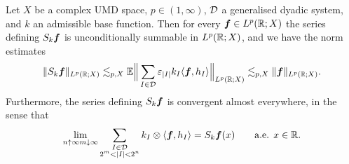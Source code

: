 \begin{thm}
  Let $X$ be a complex UMD space, $p \in (1,\infty)$, $\mathcal{D}$ a generalised dyadic system, and $k$ an admissible base function.
  Then for every $\bm{f} \in L^p(\mathbb{R};X)$ the series defining $S_{k}\bm{f}$ is unconditionally summable in $L^p(\mathbb{R};X)$,
  and we have the norm estimates
  \begin{equation*}
    \|S_{k} \bm{f}\|_{L^p(\mathbb{R};X)} \lesssim_{p,X} \mathbb{E} \Big\| \sum_{I \in \mathcal{D}} \varepsilon_{|I|} k_{I} \langle \bm{f}, h_{I} \rangle \Big\|_{L^p(\mathbb{R};X)} \lesssim_{p,X} \|\bm{f}\|_{L^p(\mathbb{R};X)}.
  \end{equation*}
  Furthermore, the series defining $S_{k}\bm{f}$ is convergent almost everywhere, in the sense that
  \begin{equation*}
    \lim_{\substack{n \uparrow \infty}{m \downarrow \infty}} \sum_{\substack{I \in \mathcal{D} \\ 2^{m} < |I| < 2^{n}}} k_{I} \otimes \langle \bm{f}, h_{I} \rangle = S_{k}\bm{f}(x) \qquad \text{a.e. } x \in \mathbb{R}.
  \end{equation*}
\end{thm}

